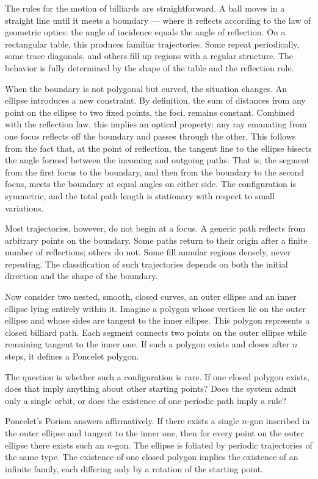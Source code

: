 The rules for the motion of billiards are straightforward. A ball moves in a straight line until it meets a boundary — where it reflects according to the law of geometric optics: the angle of incidence equals the angle of reflection. On a rectangular table, this produces familiar trajectories. Some repeat periodically, some trace diagonals, and others fill up regions with a regular structure. The behavior is fully determined by the shape of the table and the reflection rule.

When the boundary is not polygonal but curved, the situation changes. An ellipse introduces a new constraint. By definition, the sum of distances from any point on the ellipse to two fixed points, the foci, remains constant. Combined with the reflection law, this implies an optical property: any ray emanating from one focus reflects off the boundary and passes through the other. This follows from the fact that, at the point of reflection, the tangent line to the ellipse bisects the angle formed between the incoming and outgoing paths. That is, the segment from the first focus to the boundary, and then from the boundary to the second focus, meets the boundary at equal angles on either side. The configuration is symmetric, and the total path length is stationary with respect to small variations.

Most trajectories, however, do not begin at a focus. A generic path reflects from arbitrary points on the boundary. Some paths return to their origin after a finite number of reflections; others do not. Some fill annular regions densely, never repeating. The classification of such trajectories depends on both the initial direction and the shape of the boundary.

Now consider two nested, smooth, closed curves, an outer ellipse and an inner ellipse lying entirely within it. Imagine a polygon whose vertices lie on the outer ellipse and whose sides are tangent to the inner ellipse. This polygon represents a closed billiard path. Each segment connects two points on the outer ellipse while remaining tangent to the inner one. If such a polygon exists and closes after $n$ steps, it defines a Poncelet polygon.

The question is whether such a configuration is rare. If one closed polygon exists, does that imply anything about other starting points? Does the system admit only a single orbit, or does the existence of one periodic path imply a rule?

Poncelet’s Porism answers affirmatively. If there exists a single $n$-gon inscribed in the outer ellipse and tangent to the inner one, then for every point on the outer ellipse there exists such an $n$-gon. The ellipse is foliated by periodic trajectories of the same type. The existence of one closed polygon implies the existence of an infinite family, each differing only by a rotation of the starting point.

